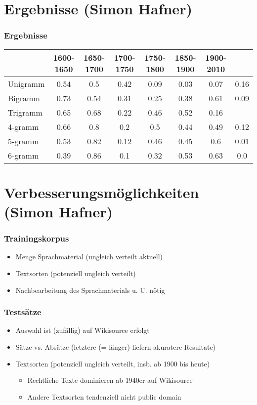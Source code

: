 \documentclass[t]{beamer} %
\begin{document}
\section{Ergebnisse (Simon Hafner)}
\begin{frame}
 \frametitle{Ergebnisse}
  \begin{tabular}{l|ccccccc}
    & 1600-1650 & 1650-1700 & 1700-1750 & 1750-1800 & 1850-1900 &
    1900-2010 \\
    \hline
    Unigramm & 0.54 & 0.5 & 0.42 & 0.09 & 0.03 & 0.07 & 0.16 \\
    Bigramm & 0.73 & 0.54 & 0.31 & 0.25 & 0.38 & 0.61 & 0.09 \\
    Trigramm & 0.65 & 0.68 & 0.22 & 0.46 & 0.52 & 0.16 \\
    4-gramm & 0.66 & 0.8 & 0.2 & 0.5 & 0.44 & 0.49 & 0.12 \\
    5-gramm & 0.53 & 0.82 & 0.12 & 0.46 & 0.45 & 0.6 & 0.01 \\
    6-gramm & 0.39 & 0.86 & 0.1 & 0.32 & 0.53 & 0.63 & 0.0 \\
  \end{tabular}
\end{frame}

\section{Verbesserungsmöglichkeiten (Simon Hafner)}
\begin{frame}
  \frametitle{Trainingskorpus}
  \begin{itemize}
  \item Menge Sprachmaterial (ungleich verteilt aktuell)\pause
  \item Textsorten (potenziell ungleich verteilt)\pause
  \item Nachbearbeitung des Sprachmaterials u. U. nötig\pause
  \end{itemize}  
\end{frame}

\begin{frame}
  \frametitle{Testsätze}
  \begin{itemize}
  \item Auswahl ist (zufällig) auf Wikisource erfolgt\pause
  \vspace*{1ex}
  \item Sätze vs. Absätze (letztere (= länger) liefern akuratere Resultate)\pause
  \item Textsorten (potenziell ungleich verteilt, insb. ab 1900 bis heute)\pause
  \begin{itemize}
   \item Rechtliche Texte dominieren ab 1940er auf Wikisource
   \item Andere Textsorten tendenziell nicht public domain
  \end{itemize}
  \end{itemize}  
\end{frame}
\end{document}
